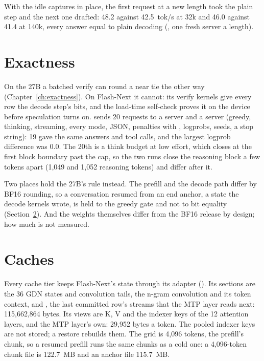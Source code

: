 With the idle captures in place, the first request at a new length took the plain step and the next one drafted: 48.2 against 42.5~tok/s at 32k and 46.0 against 41.4 at 140k, every answer equal to plain decoding (\measured, one fresh server a length).

\section{Exactness}\label{sec:fn-exact}

On the 27B a batched verify can round a near tie the other way (Chapter~\ref{ch:exactness}). On Flash-Next it cannot: its verify kernels give every row the decode step's bits, and the load-time self-check proves it on the device before speculation turns on.  sends 20 requests to a  server and a  server (greedy, thinking, streaming, every  mode, JSON, penalties with , logprobs, seeds, a stop string): 19 gave the same answers and tool calls, and the largest logprob difference was 0.0. The 20th is a think budget at low effort, which closes at the first block boundary past the cap, so the two runs close the reasoning block a few tokens apart (1,049 and 1,052 reasoning tokens) and differ after it.

Two places hold the 27B's rule instead. The prefill and the decode path differ by BF16 rounding, so a conversation resumed from an end anchor, a state the decode kernels wrote, is held to the greedy gate and not to bit equality (Section~\ref{sec:fn-caches}). And the weights themselves differ from the BF16 release by design; how much is not measured.

\section{Caches}\label{sec:fn-caches}

Every cache tier keeps Flash-Next's state through its adapter (). Its sections are the 36 GDN states and convolution tails, the n-gram convolution and its token context, and , the last committed row's streams that the MTP layer reads next: 115,662,864 bytes. Its views are K, V and the indexer keys of the 12 attention layers, and the MTP layer's own: 29,952 bytes a token. The pooled indexer keys are not stored; a restore rebuilds them. The grid is 4,096 tokens, the prefill's chunk, so a resumed prefill runs the same chunks as a cold one: a 4,096-token chunk file is 122.7~MB and an anchor file 115.7~MB.


